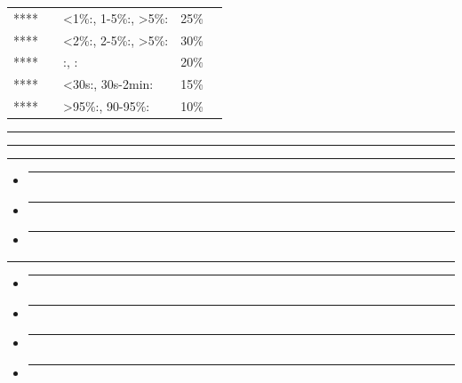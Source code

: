 \begin{longtable}[]{@{}lllll@{}}
\toprule\noalign{}
\endhead
\bottomrule\noalign{}
\endlastfoot
**** & & \textless1\%:, 1-5\%:, \textgreater5\%: & 25\% & \\
**** & & \textless2\%:, 2-5\%:, \textgreater5\%: & 30\% & \\
**** & & :, : & 20\% & \\
**** & & \textless30s:, 30s-2min: & 15\% & \\
**** & & \textgreater95\%:, 90-95\%: & 10\% & \\
\end{longtable}

\begin{center}\rule{0.5\linewidth}{0.5pt}\end{center}

\begin{center}\rule{0.5\linewidth}{0.5pt}\end{center}

\begin{center}\rule{0.5\linewidth}{0.5pt}\end{center}

\begin{itemize}
\item
  \begin{center}\rule{0.5\linewidth}{0.5pt}\end{center}
\item
  \begin{center}\rule{0.5\linewidth}{0.5pt}\end{center}
\item
  \begin{center}\rule{0.5\linewidth}{0.5pt}\end{center}
\end{itemize}

\begin{center}\rule{0.5\linewidth}{0.5pt}\end{center}

\begin{itemize}
\item
  \begin{center}\rule{0.5\linewidth}{0.5pt}\end{center}
\item
  \begin{center}\rule{0.5\linewidth}{0.5pt}\end{center}
\item
  \begin{center}\rule{0.5\linewidth}{0.5pt}\end{center}
\item
  \begin{center}\rule{0.5\linewidth}{0.5pt}\end{center}
\end{itemize}

